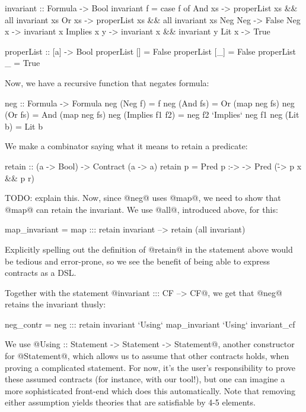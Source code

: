 \begin{code}
invariant :: Formula -> Bool
invariant f = case f of
  And xs      -> properList xs && all invariant xs
  Or xs       -> properList xs && all invariant xs
  Neg Neg{}   -> False
  Neg x       -> invariant x
  Implies x y -> invariant x && invariant y
  Lit x       -> True

properList :: [a] -> Bool
properList []  = False
properList [_] = False
properList _   = True
\end{code}

Now, we have a recursive function that negates formula:

\begin{code}
neg :: Formula -> Formula
neg (Neg f)         = f
neg (And fs)        = Or (map neg fs)
neg (Or fs)         = And (map neg fs)
neg (Implies f1 f2) = neg f2 `Implies` neg f1
neg (Lit b)         = Lit b
\end{code}

We make a combinator saying what it means to retain a predicate:

\begin{code}
retain :: (a -> Bool) -> Contract (a -> a)
retain p = Pred p :-> \x -> Pred (\r -> p x && p r)
\end{code}

TODO: explain this. Now, since @neg@ uses @map@, we need to show that
@map@ can retain the invariant. We use @all@, introduced above, for
this:

\begin{code}
map_invariant = map ::: retain invariant
                    --> retain (all invariant)
\end{code}

Explicitly spelling out the definition of @retain@ in the statement
above would be tedious and error-prone, so we see the benefit of being
able to express contracts as a DSL.

Together with the statement @invariant ::: CF --> CF@, we
get that @neg@ retains the invariant thusly:

\begin{code}
neg_contr = neg ::: retain invariant
    `Using` map_invariant
    `Using` invariant_cf
\end{code}

We use @Using :: Statement -> Statement -> Statement@, another
constructor for @Statement@, which allows us to assume that other
contracts holds, when proving a complicated statement. For now, it's
the user's responsibility to prove these assumed contracts (for
instance, with our tool!), but one can imagine a more sophisticated
front-end which does this automatically.  Note that removing either
assumption yields theories that are satisfiable by 4-5 elements.

